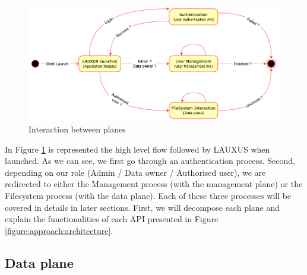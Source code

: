 \documentclass[../main.tex]{subfiles}
\begin{document}
\begin{figure}[ht]
    \centering
    \includegraphics[width=\textwidth]{images/lauxus/architecture_process}
    
    \caption{Interaction between planes}
    \label{figure:lauxus:architecture_process}
\end{figure}
\par In Figure \ref{figure:lauxus:architecture_process} is represented the high level flow followed by LAUXUS when launched. As we can see, we first go through an authentication process. Second, depending on our role (Admin / Data owner / Authorised user), we are redirected to either the Management process (with the management plane) or the Filesystem process (with the data plane). Each of these three processes will be covered in details in later sections. First, we will decompose each plane and explain the functionalities of each API presented in Figure \ref{figure:approach:architecture}.


\subsection{Data plane}
\label{section:lauxus:architecture_dataplane}
\end{document}

